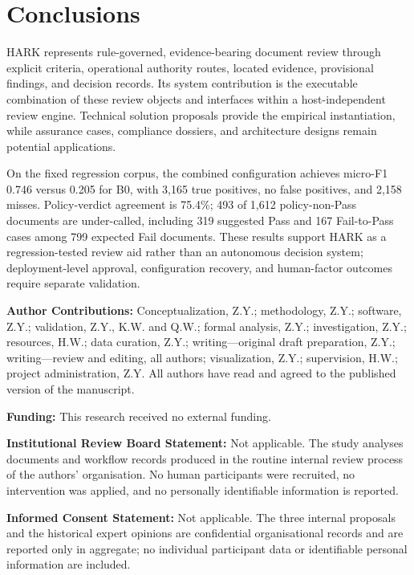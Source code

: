 \documentclass[computers,article,submit,moreauthors]{Definitions/mdpi}
\begin{document}
\section{Conclusions}

HARK represents rule-governed, evidence-bearing document review through explicit criteria, operational authority routes, located evidence, provisional findings, and decision records. Its system contribution is the executable combination of these review objects and interfaces within a host-independent review engine. Technical solution proposals provide the empirical instantiation, while assurance cases, compliance dossiers, and architecture designs remain potential applications.

On the fixed regression corpus, the combined configuration achieves micro-F1 0.746 versus 0.205 for B0, with 3,165 true positives, no false positives, and 2,158 misses. Policy-verdict agreement is 75.4\%; 493 of 1,612 policy-non-Pass documents are under-called, including 319 suggested Pass and 167 Fail-to-Pass cases among 799 expected Fail documents. These results support HARK as a regression-tested review aid rather than an autonomous decision system; deployment-level approval, configuration recovery, and human-factor outcomes require separate validation.

\vspace{6pt}

\noindent\textbf{Author Contributions:} Conceptualization, Z.Y.; methodology, Z.Y.; software, Z.Y.; validation, Z.Y., K.W. and Q.W.; formal analysis, Z.Y.; investigation, Z.Y.; resources, H.W.; data curation, Z.Y.; writing---original draft preparation, Z.Y.; writing---review and editing, all authors; visualization, Z.Y.; supervision, H.W.; project administration, Z.Y. All authors have read and agreed to the published version of the manuscript.

\noindent\textbf{Funding:} This research received no external funding.

\noindent\textbf{Institutional Review Board Statement:} Not applicable. The study analyses documents and workflow records produced in the routine internal review process of the authors' organisation. No human participants were recruited, no intervention was applied, and no personally identifiable information is reported.

\noindent\textbf{Informed Consent Statement:} Not applicable. The three internal proposals and the historical expert opinions are confidential organisational records and are reported only in aggregate; no individual participant data or identifiable personal information are included.
\end{document}
